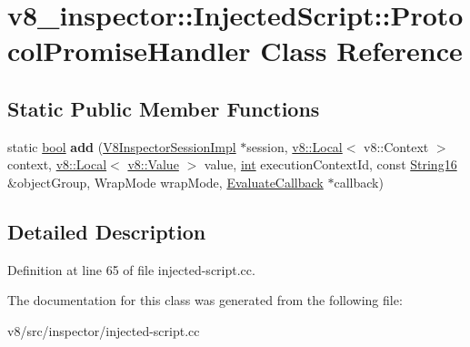 \hypertarget{classv8__inspector_1_1InjectedScript_1_1ProtocolPromiseHandler}{}\section{v8\+\_\+inspector\+:\+:Injected\+Script\+:\+:Protocol\+Promise\+Handler Class Reference}
\label{classv8__inspector_1_1InjectedScript_1_1ProtocolPromiseHandler}
\subsection*{Static Public Member Functions}
\begin{DoxyCompactItemize}
\item 
\mbox{\label{classv8__inspector_1_1InjectedScript_1_1ProtocolPromiseHandler_a6f764e0001b98d0fd433d19a628b1c49}} 
static \mbox{\hyperlink{classbool}{bool}} {\bfseries add} (\mbox{\hyperlink{classv8__inspector_1_1V8InspectorSessionImpl}{V8\+Inspector\+Session\+Impl}} $\ast$session, \mbox{\hyperlink{classv8_1_1Local}{v8\+::\+Local}}$<$ v8\+::\+Context $>$ context, \mbox{\hyperlink{classv8_1_1Local}{v8\+::\+Local}}$<$ \mbox{\hyperlink{classv8_1_1Value}{v8\+::\+Value}} $>$ value, \mbox{\hyperlink{classint}{int}} execution\+Context\+Id, const \mbox{\hyperlink{classv8__inspector_1_1String16}{String16}} \&object\+Group, Wrap\+Mode wrap\+Mode, \mbox{\hyperlink{classv8__inspector_1_1EvaluateCallback}{Evaluate\+Callback}} $\ast$callback)
\end{DoxyCompactItemize}


\subsection{Detailed Description}


Definition at line 65 of file injected-\/script.\+cc.



The documentation for this class was generated from the following file\+:\begin{DoxyCompactItemize}
\item 
v8/src/inspector/injected-\/script.\+cc\end{DoxyCompactItemize}
